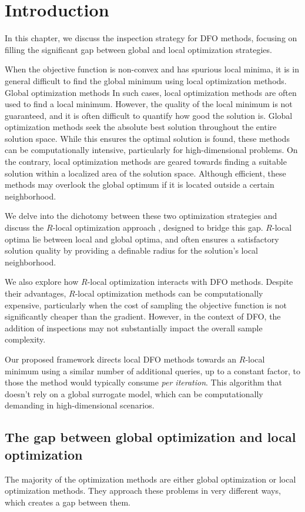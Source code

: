 \section{Introduction}
In this chapter, we discuss the inspection strategy for DFO methods, focusing on filling the significant gap between global and local optimization strategies.

When the objective function is non-convex and has spurious local minima, it is in general difficult to find the global minimum using local optimization methods.
Global optimization methods
In such cases, local optimization methods are often used to find a local minimum. However, the quality of the local minimum is not guaranteed, and it is often difficult to quantify how good the solution is.
Global optimization methods seek the absolute best solution throughout the entire solution space. While this ensures the optimal solution is found, these methods can be computationally intensive, particularly for high-dimensional problems. On the contrary, local optimization methods are geared towards finding a suitable solution within a localized area of the solution space. Although efficient, these methods may overlook the global optimum if it is located outside a certain neighborhood.

We delve into the dichotomy between these two optimization strategies and discuss the $R$-local optimization approach \cite{chen2019run}, designed to bridge this gap. $R$-local optima lie between local and global optima, and often ensures a satisfactory solution quality by providing a definable radius for the solution's local neighborhood.

We also explore how $R$-local optimization interacts with DFO methods. Despite their advantages, $R$-local optimization methods can be computationally expensive, particularly when the cost of sampling the objective function is not significantly cheaper than the gradient. However, in the context of DFO, the addition of inspections may not substantially impact the overall sample complexity.

Our proposed framework directs local DFO methods towards an $R$-local minimum using a similar number of additional queries, up to a constant factor, to those the method would typically consume \emph{per iteration}. This algorithm that doesn't rely on a global surrogate model, which can be computationally demanding in high-dimensional scenarios.


\subsection{The gap between global optimization and local optimization}
The majority of the optimization methods are either global optimization or local optimization methods. They approach these problems in very different ways, which creates a gap between them. 

